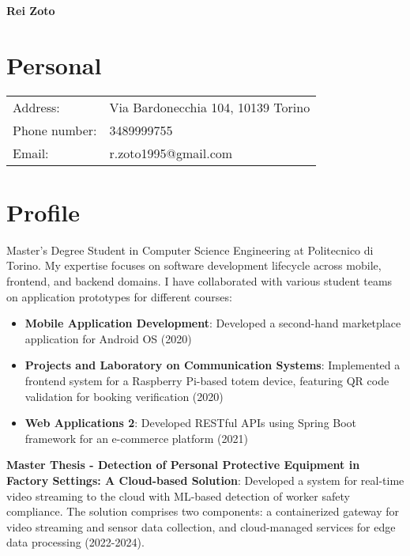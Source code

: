 \documentclass[10.5pt,a4paper]{article}
\begin{document}
\begin{minipage}{0.2\textwidth}
\end{minipage}
\begin{minipage}{0.8\textwidth}
    {\huge\bfseries Rei Zoto}
\end{minipage}

\section*{Personal}
\begin{tabular}{ll}
Address: & Via Bardonecchia 104, 10139 Torino \\
Phone number: & 3489999755 \\
Email: & r.zoto1995@gmail.com
\end{tabular}

\section*{Profile}
Master's Degree Student in Computer Science Engineering at Politecnico di Torino. My expertise focuses on software development lifecycle across mobile, frontend, and backend domains. I have collaborated with various student teams on application prototypes for different courses:

\begin{itemize}[leftmargin=*]
\item \textbf{Mobile Application Development}: Developed a second-hand marketplace application for Android OS (2020)
\item \textbf{Projects and Laboratory on Communication Systems}: Implemented a frontend system for a Raspberry Pi-based totem device, featuring QR code validation for booking verification (2020)
\item \textbf{Web Applications 2}: Developed RESTful APIs using Spring Boot framework for an e-commerce platform (2021)
\end{itemize}

\textbf{Master Thesis - Detection of Personal Protective Equipment in Factory Settings: A Cloud-based Solution}: Developed a system for real-time video streaming to the cloud with ML-based detection of worker safety compliance. The solution comprises two components: a containerized gateway for video streaming and sensor data collection, and cloud-managed services for edge data processing (2022-2024).
\end{document}
